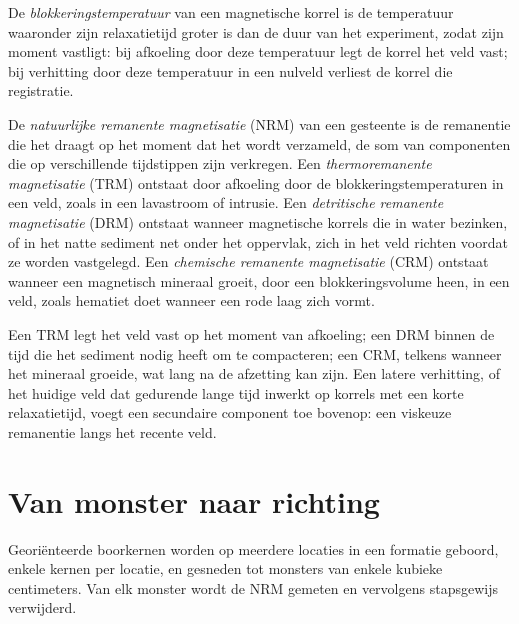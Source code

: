 \begin{definition}[Blokkeringstemperatuur]\label{def:b3:palaeomagnetism:blocking}
De \emph{blokkeringstemperatuur} van een magnetische korrel is de
temperatuur waaronder zijn relaxatietijd groter is dan de duur van het experiment, zodat zijn
moment vastligt: bij afkoeling door deze temperatuur legt de korrel het veld vast;
bij verhitting door deze temperatuur in een nulveld verliest de korrel die
registratie.
\end{definition}

\begin{definition}\label{def:b3:palaeomagnetism:nrm}
De \emph{natuurlijke remanente magnetisatie}
(NRM) van een gesteente is de remanentie die het draagt op het moment dat het wordt verzameld, de som van
componenten die op verschillende tijdstippen zijn verkregen. Een \emph{thermoremanente
magnetisatie} (TRM) ontstaat door afkoeling door de
blokkeringstemperaturen in een veld, zoals in een lavastroom of
intrusie. Een \emph{detritische remanente magnetisatie}
(DRM) ontstaat wanneer magnetische korrels die in water bezinken, of in het natte sediment
net onder het oppervlak, zich in het veld richten voordat ze
worden vastgelegd. Een \emph{chemische remanente magnetisatie}
(CRM) ontstaat wanneer een magnetisch mineraal groeit, door een
blokkeringsvolume heen, in een veld, zoals hematiet doet wanneer een rode laag zich vormt.
\end{definition}

Een TRM legt het veld vast op het moment van afkoeling; een DRM binnen de tijd die het
sediment nodig heeft om te compacteren; een CRM, telkens wanneer het mineraal groeide, wat
lang na de afzetting kan zijn. Een latere verhitting, of het huidige veld dat gedurende lange tijd
inwerkt op korrels met een korte relaxatietijd, voegt een secundaire component toe bovenop: een
viskeuze remanentie langs het recente veld.

\section{Van monster naar richting}

Georiënteerde boorkernen worden op meerdere locaties in een formatie geboord, enkele kernen per
locatie, en gesneden tot monsters van enkele kubieke centimeters. Van elk monster wordt de NRM
gemeten en vervolgens stapsgewijs verwijderd.

